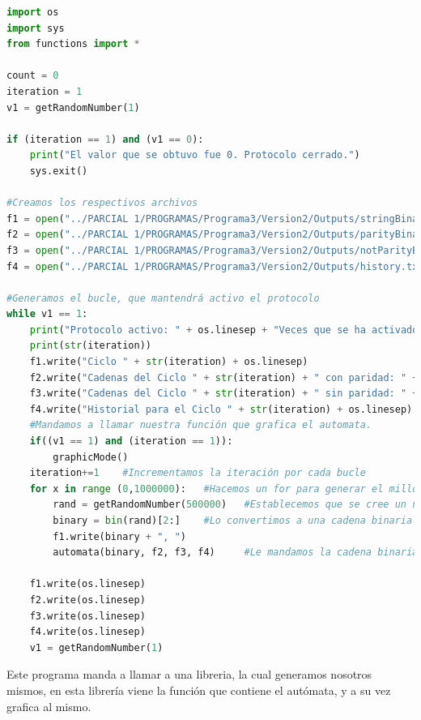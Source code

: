 \documentclass{article}
\begin{document}
\begin{lstlisting}[language=Python, caption=Implementación de DFA]
import os
import sys
from functions import *

count = 0
iteration = 1
v1 = getRandomNumber(1)

if (iteration == 1) and (v1 == 0):
    print("El valor que se obtuvo fue 0. Protocolo cerrado.")
    sys.exit()

#Creamos los respectivos archivos
f1 = open("../PARCIAL 1/PROGRAMAS/Programa3/Version2/Outputs/stringBinary.txt", "w")
f2 = open("../PARCIAL 1/PROGRAMAS/Programa3/Version2/Outputs/parityBinary.txt", "w")
f3 = open("../PARCIAL 1/PROGRAMAS/Programa3/Version2/Outputs/notParityBinary.txt", "w")
f4 = open("../PARCIAL 1/PROGRAMAS/Programa3/Version2/Outputs/history.txt", "w")

#Generamos el bucle, que mantendrá activo el protocolo
while v1 == 1:
    print("Protocolo activo: " + os.linesep + "Veces que se ha activado: ")
    print(str(iteration))
    f1.write("Ciclo " + str(iteration) + os.linesep)
    f2.write("Cadenas del Ciclo " + str(iteration) + " con paridad: " + os.linesep)
    f3.write("Cadenas del Ciclo " + str(iteration) + " sin paridad: " + os.linesep)
    f4.write("Historial para el Ciclo " + str(iteration) + os.linesep)
    #Mandamos a llamar nuestra función que grafica el automata.
    if((v1 == 1) and (iteration == 1)):
        graphicMode()
    iteration+=1    #Incrementamos la iteración por cada bucle
    for x in range (0,1000000):   #Hacemos un for para generar el millón de cadenas binarias.
        rand = getRandomNumber(500000)   #Establecemos que se cree un número random
        binary = bin(rand)[2:]    #Lo convertimos a una cadena binaria
        f1.write(binary + ", ")      
        automata(binary, f2, f3, f4)     #Le mandamos la cadena binaria y los archivos para que pueda escribir sobre ellos.
    
    f1.write(os.linesep)
    f2.write(os.linesep)
    f3.write(os.linesep)
    f4.write(os.linesep)
    v1 = getRandomNumber(1) 
\end{lstlisting}

Este programa manda a llamar a una libreria, la cual generamos nosotros mismos, en esta librería viene la función que contiene el autómata, y a su vez grafica al mismo.
\end{document}
